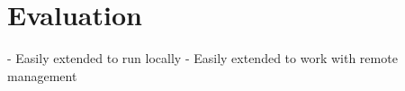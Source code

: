 \chapter{Evaluation}
- Easily extended to run locally
- Easily extended to work with remote management